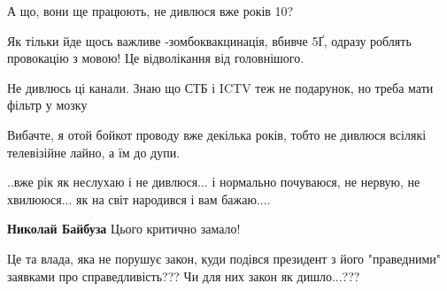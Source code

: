 \begin{itemize}
А що, вони ще працюють, не дивлюся вже років 10?

 
Як тільки йде щось важливе -зомбоквакцинація, вбивче 5Ґ, одразу роблять провокацію з мовою! Це відволікання від головнішого.

 
Не дивлюсь ці канали. Знаю що СТБ і ICTV теж не подарунок, но треба мати фільтр у мозку

 
Вибачте, я отой бойкот проводу вже декілька років, тобто не дивлюся всілякі телевізійне лайно, а їм до дупи.

 
..вже рік як неслухаю і не дивлюся... і нормально почуваюся, не нервую, не хвилююся... як на світ народився і вам бажаю....

 
\textbf{Николай Байбуза} Цього критично замало!

 
Це та влада, яка не порушує закон, куди подівся президент з його "праведними" заявками про справедливість??? Чи для них закон як дишло...???


\end{itemize}
